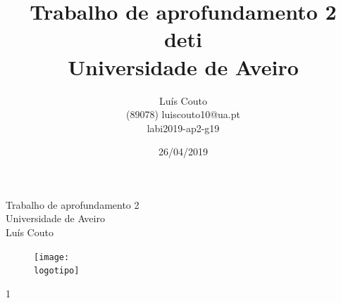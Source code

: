 \documentclass{report}
\begin{document}
%
\def\titulo{Trabalho de aprofundamento 2}
\def\data{26/04/2019}
\def\autores{Luís Couto}
\def\autorescontactos{(89078) luiscouto10@ua.pt}
\def\versao{1}
\def\departamento{\acs{deti}}
\def\empresa{Universidade de Aveiro}
\def\logotipo{ua.pdf}
\def\projeto{labi2019-ap2-g19}
%
%
\begin{titlepage}

\begin{center}
%
\vspace*{50mm}
%
{\Huge \titulo}\\ 
%
\vspace{10mm}
%
{\Large \empresa}\\
%
\vspace{10mm}
%
{\LARGE \autores}\\ 
%
\vspace{30mm}
%
\begin{figure}[h]
\center
\texttt{[image: \\logotipo]}
\end{figure}
%
\vspace{30mm}
\end{center}
%
\begin{flushright}
\versao
\end{flushright}
\end{titlepage}


\title{%
{\Huge\textbf{\titulo}}\\
{\Large \departamento\\ \empresa}
}
%
\author{%
    \autores \\
    \autorescontactos \\
    \projeto
}
%
\date{\data}
%
\maketitle

 
\end{document}
